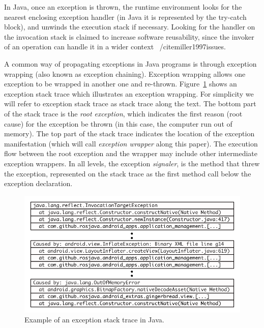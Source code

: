 \documentclass[conference]{IEEEtran}
\begin{document}

In Java, once an exception is thrown, the runtime environment looks for the nearest enclosing exception handler
(in Java it is represented by the try-catch block), and unwinds the execution stack if necessary.
 Looking for the handler on the invocation stack is claimed to increase software reusability, 
since the invoker of an operation can handle it in a wider context ~/cite{miller1997issues}.

 A common way of  propagating exceptions in Java programs is through exception wrapping
 (also known as exception chaining). Exception wrapping allows one exception 
to be wrapped in another one and re-thrown. Figure~\ref{fig:wrapping} shows 
an exception stack trace which illustrates an exception wrapping. 
For simplicity we will refer to exception stack trace as stack trace along the text.
The bottom part of the stack trace is the \emph{root exception}, which indicates
the first reason (root cause) for the exception be thrown (in this case, the computer run out of
memory). The top part of the stack trace indicates the location of the exception
manifestation (which will call \emph{exception wrapper} along this paper). The
execution flow  between the root exception and the wrapper may
include other intermediate exception wrappers. In all levels, the exception
\emph{signaler}, is the method that threw the exception, represented on the
stack trace as the first method call below the exception declaration.

\begin{figure} \centering \includegraphics[scale=0.6]{stacktrace_bw.png}
\caption{Example of an exception stack trace in Java.}
\label{fig:wrapping}
\end{figure}
\end{document}
